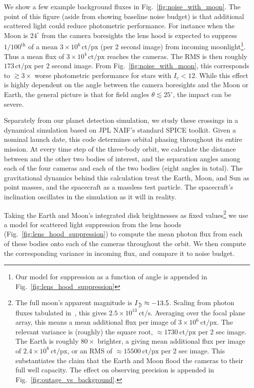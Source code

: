 We show a few
example background fluxes in Fig.~\ref{fig:noise_with_moon}.
The point of this figure (aside from showing \tesss baseline noise budget) is 
that additional scattered light could reduce \tesss photometric performance. 
For instance when the Moon is $24^\circ$ from the camera boresights the lens hood is expected to suppress $1/100^\mathrm{th}$ of a mean $3\times10^6\,\mathrm{ct/px}$ (per 2 second image) from incoming moonlight\footnote{Our model for suppression as a function of angle is appended in Fig.~\ref{fig:lens_hood_suppression}}.
Thus a mean flux of $3\times10^4\,\mathrm{ct/px}$ reaches the cameras. 
The RMS is then roughly $173\,\mathrm{ct/px}$ per 2 second image.
From Fig.~\ref{fig:noise_with_moon}, this corresponds to $\gtrsim\!3\times$ 
worse photometric performance for stars with $I_c < 12$.
While this effect is highly dependent on the angle between the camera boresights and the Moon or Earth, the general picture is that for field angles $\theta \lesssim25^{\circ}$, the impact can be severe.

Separately from our planet detection simulation, we study these 
crossings in a dynamical simulation based on JPL NAIF's standard SPICE toolkit.
Given a nominal launch date, this code determines \tesss orbital phasing 
throughout its entire mission. 
At every time step of the three-body orbit, we calculate the distance between 
\tess and the other two bodies of interest, and the separation angles among 
each of the four cameras and each of the two bodies (eight angles in total). 
The gravitational dynamics behind this calculation treat the Earth, Moon, and 
Sun as point masses, and the \tess spacecraft as a massless test particle.
The spacecraft's inclination oscillates in the simulation as it will in 
reality.

Taking the Earth and Moon's integrated disk brightnesses as fixed 
values\footnote{The full moon's apparent magnitude is $I_\moon \approx -13.5$. Scaling from photon fluxes tabulated in~\citet{winn_photonflux_2013}, this gives $2.5\times10^{13}\ \mathrm{ct/s}$. Averaging over the focal plane array, this means a mean additional flux per image of $3\times10^6\ \mathrm{ct/px}$.
The relevant variance is (roughly) the square root, $\approx 1730\ \mathrm{ct/px}$ per 2 sec image.
The Earth is roughly $80\times$ brighter, a giving mean additional flux per image of $2.4\times10^8\ \mathrm{ct/px}$, or an RMS of $\approx 15500\ \mathrm{ct/px}$ per 2 sec image.
This substantiates the claim that the Earth and Moon flood the cameras to their full well capacity. The effect on observing precision is appended in Fig.~\ref{fig:outage_vs_background}.} we use a model for scattered light suppression from 
the \tess lens hoods (Fig.~\ref{fig:lens_hood_suppression}) to compute the 
mean photon flux from each of these bodies onto each of the cameras throughout 
the orbit. We then compute the corresponding variance in incoming flux, and 
compare it to \tesss noise budget.

